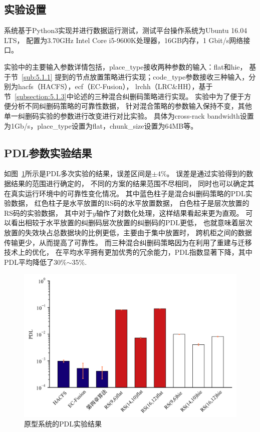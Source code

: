 \subsection{实验设置}
系统基于Python3实现并进行数据运行测试，测试平台操作系统为Ubuntu 16.04 LTS，
配置为3.70GHz Intel Core i5-9600K处理器，16GB内存，1 Gbit/s网络接口。

实验中的主要输入参数详情包括，place\_type接收两种参数的输入：flat和hie，
基于节~\ref{sub:5.1.1}
提到的节点放置策略进行实现；code\_type参数接收三种输入，分别为hacfs（HACFS），ecf（EC-Fusion），
lrchh（LRC\&HH），基于节~\ref{subsection:5.1.3}中论述的三种混合纠删码策略进行实现。
实验中为了便于方便分析不同纠删码策略的可靠性数据，
针对混合策略的参数输入保持不变，其他单一纠删码实验的参数进行改变进行对比实验。
具体为cross-rack bandwidth设置为1Gb/s，place\_type设置为flat，chunk\_size设置为64MB等。 

\subsection{PDL参数实验结果}
如图~\ref{fig:5-4}所示是PDL多次实验的结果，误差区间是$\pm 4\%$。
误差是通过实验得到的数据结果的范围进行确定的，
不同的方案的结果范围不尽相同，
同时也可以确定其在真实运行环境中的可靠性变化情况。
其中蓝色柱子是混合纠删码策略的PDL实验数据，
红色柱子是水平放置的RS码的水平放置数据，
白色柱子是层次放置的RS码的实验数据，
其中对于$y$轴作了对数化处理，这样结果看起来更为直观。
可以看出相较于水平放置的纠删码层次放置的纠删码的PDL更低，
也就意味着层次放置的失效块占总数据块的比例更低，主要由于集中放置时，
跨机柜之间的数据传输更少，从而提高了可靠性。
而三种混合纠删码策略因为在利用了重建与迁移技术上的优化，
在平均水平拥有更加优秀的冗余能力，PDL指数显著下降，其中PDL平均降低了30\%$\sim$35\%.


\begin{figure}[htbp]
	\centering
	\includegraphics [scale=0.06]{figures/5-4.jpg}
	\caption{原型系统的PDL实验结果}
	\label{fig:5-4}
\end{figure}

